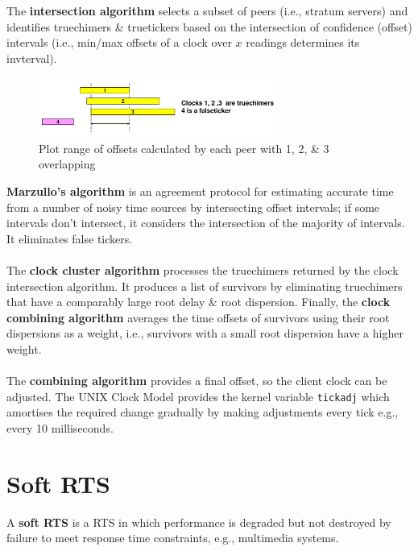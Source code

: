 \documentclass[a4paper,11pt]{article}
\begin{document}
The \textbf{intersection algorithm} selects a subset of peers (i.e., stratum servers) and identifies truechimers \& truetickers based on the intersection of confidence (offset) intervals (i.e., min/max offsets of a clock over $x$ readings determines its invterval).

\begin{figure}[H]
    \centering
    \includegraphics[width=0.7\textwidth]{./images/intersectional.png}
    \caption{ Plot range of offsets calculated by each peer with 1, 2, \& 3 overlapping}
\end{figure}

\textbf{Marzullo's algorithm} is an agreement protocol for estimating accurate time from a number of noisy time sources by intersecting offset intervals; if some intervals don't intersect, it considers the intersection of the majority of intervals.
It eliminates false tickers.
\\\\
The \textbf{clock cluster algorithm} processes the truechimers returned by the clock intersection algorithm.
It produces a list of survivors by eliminating truechimers that have a comparably large root delay \& root dispersion.
Finally, the \textbf{clock combining algorithm} averages the time offsets of survivors using their root dispersions as a weight, i.e., survivors with a small root dispersion have a higher weight.
\\\\
The \textbf{combining algorithm} provides a final offset, so the client clock can be adjusted.
The UNIX Clock Model provides the kernel variable \verb|tickadj| which amortises the required change gradually by making adjustments every tick e.g., every 10 milliseconds.

\section{Soft RTS}
A \textbf{soft RTS} is a RTS in which performance is degraded but not destroyed by failure to meet response time constraints, e.g., multimedia systems.
\end{document}
